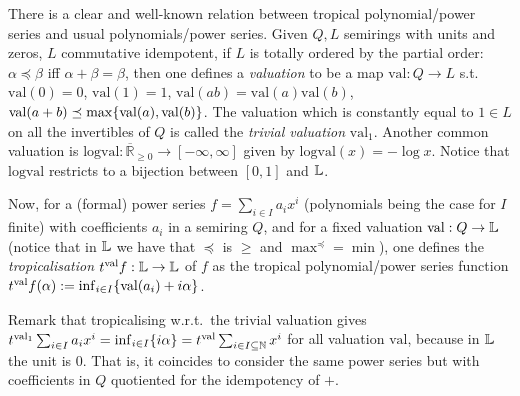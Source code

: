%
%



\begin{remark}\label{rmk:val_trop}
 There is a clear and well-known relation between tropical polynomial/power series and usual polynomials/power series. 
Given $Q,L$ semirings with units and zeros, $L$ commutative idempotent, if $L$ is totally ordered by the partial order: $\alpha \preceq \beta$ iff $\alpha +  \beta = \beta$, then one defines a \emph{valuation} \cite{Izhakian2015} to be a map $\mathrm{val}:Q\to L$ s.t.\ $\mathrm{val}(0)=0$, $\mathrm{val}(1)=1$, $\mathrm{val}(ab)=\mathrm{val}(a)\mathrm{val}(b)$, $\mathrm{val}(a+b)\preceq \max\{\mathrm{val}(a),\mathrm{val}(b)\}$.
The valuation which is constantly equal to $1\in L$ on all the invertibles of $Q$ is called the \emph{trivial valuation} $\mathrm{val}_1$.
Another common valuation is $\mathrm{logval}: \overline{\mathbb R}_{\geq 0} \to [-\infty, \infty]$ given by $\mathrm{logval}(x)=-\log x$. Notice that $\mathrm{logval}$ restricts to a bijection between $[0,1]$ and $\mathbb{L}$.

Now, for a (formal) power series $f=\sum_{i\in I} a_i x^i$ (polynomials being the case for $I$ finite) with coefficients $a_i$ in a semiring $Q$, and for a fixed valuation $\mathrm{val}:Q\to \mathbb{L}$ (notice that in $\mathbb{L}$ we have that $\preceq$ is $\geq$ and $\max^{\preceq}=\min$), one defines the \emph{tropicalisation} $\trop^{\mathrm{val}}f:\Lawv \to \Lawv$ of $f$ as the tropical polynomial/power series function $\trop^{\mathrm{val}}f(\alpha):=\inf_{i\in I} \set{\mathrm{val}(a_i)+i\alpha}$.

Remark that tropicalising w.r.t.\ the trivial valuation gives $\trop^{\mathrm{val}_1} \sum_{i\in I} a_i x^i = \inf_{i\in I} \set{i\alpha} = \trop^{\mathrm{val}} \sum_{i\in I\subseteq\N} x^i$ for all valuation $\mathrm{val}$, because in $\mathbb{L}$ the unit is $0$. %
That is, it coincides to consider the same power series but with coefficients in $Q$ quotiented for the idempotency of $+$.
\end{remark}

%

